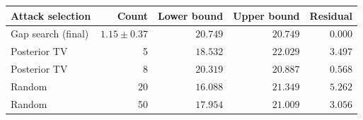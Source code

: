 \begin{tabular}{@{}lrrrr@{}}
\toprule
Attack selection & Count & Lower bound & Upper bound & Residual \\
\midrule
Gap search (final) & $1.15 \pm 0.37$ & $20.749$ & $20.749$ & $0.000$ \\
Posterior TV & 5 & $18.532$ & $22.029$ & $3.497$ \\
Posterior TV & 8 & $20.319$ & $20.887$ & $0.568$ \\
Random & 20 & $16.088$ & $21.349$ & $5.262$ \\
Random & 50 & $17.954$ & $21.009$ & $3.056$ \\
\bottomrule
\end{tabular}
